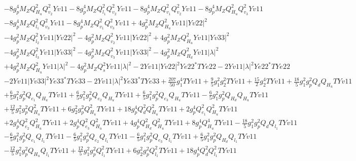 \begin{align}
 &-8 g_{p}^{4} M_Z Q_{H_u}^{2} Q_{v_2}^{2} Yv11 -8 g_{p}^{4} M_Z Q_{l_1}^{2} Q_{v_2}^{2} Yv11 -8 g_{p}^{4} M_Z Q_{v_1}^{2} Q_{v_2}^{2} Yv11 -8 g_{p}^{4} M_Z Q_{H_u}^{2} Q_{v_3}^{2} Yv11 \nonumber \\ 
 &-8 g_{p}^{4} M_Z Q_{l_1}^{2} Q_{v_3}^{2} Yv11 -8 g_{p}^{4} M_Z Q_{v_1}^{2} Q_{v_3}^{2} Yv11 +4 g_{p}^{2} M_Z Q_{H_u}^{2} Yv11 |Yv22|^2 \nonumber \\ 
 &-4 g_{p}^{2} M_Z Q_{l_2}^{2} Yv11 |Yv22|^2 -4 g_{p}^{2} M_Z Q_{v_2}^{2} Yv11 |Yv22|^2 +4 g_{p}^{2} M_Z Q_{H_u}^{2} Yv11 |Yv33|^2 \nonumber \\ 
 &-4 g_{p}^{2} M_Z Q_{l_3}^{2} Yv11 |Yv33|^2 -4 g_{p}^{2} M_Z Q_{v_3}^{2} Yv11 |Yv33|^2 -4 g_{p}^{2} M_Z Q_{H_d}^{2} Yv11 |\lambda|^2 \nonumber \\ 
 &+4 g_{p}^{2} M_Z Q_{H_u}^{2} Yv11 |\lambda|^2 -4 g_{p}^{2} M_Z Q_{s}^{2} Yv11 |\lambda|^2 -2 Yv11 |Yv22|^2 Ye22^* TYe22 -2 Yv11 |\lambda|^2 Ye22^* TYe22 \nonumber \\ 
 &-2 Yv11 |Yv33|^2 Ye33^* TYe33 -2 Yv11 |\lambda|^2 Ye33^* TYe33 +\frac{207}{50} g_{1}^{4} TYv11 +\frac{9}{5} g_{1}^{2} g_{2}^{2} TYv11 +\frac{15}{2} g_{2}^{4} TYv11 +\frac{18}{5} g_{1}^{2} g_{p}^{2} Q_{d} Q_{H_u} TYv11 \nonumber \\ 
 &+\frac{6}{5} g_{1}^{2} g_{p}^{2} Q_{e_{1}} Q_{H_u} TYv11 +\frac{6}{5} g_{1}^{2} g_{p}^{2} Q_{e_{2}} Q_{H_u} TYv11 +\frac{6}{5} g_{1}^{2} g_{p}^{2} Q_{e_3} Q_{H_u} TYv11 -\frac{6}{5} g_{1}^{2} g_{p}^{2} Q_{H_d} Q_{H_u} TYv11 \nonumber \\ 
 &+\frac{12}{5} g_{1}^{2} g_{p}^{2} Q_{H_u}^{2} TYv11 +6 g_{2}^{2} g_{p}^{2} Q_{H_u}^{2} TYv11 +18 g_{p}^{4} Q_{d}^{2} Q_{H_u}^{2} TYv11 +2 g_{p}^{4} Q_{e_{1}}^{2} Q_{H_u}^{2} TYv11 \nonumber \\ 
 &+2 g_{p}^{4} Q_{e_{2}}^{2} Q_{H_u}^{2} TYv11 +2 g_{p}^{4} Q_{e_3}^{2} Q_{H_u}^{2} TYv11 +4 g_{p}^{4} Q_{H_d}^{2} Q_{H_u}^{2} TYv11 +8 g_{p}^{4} Q_{H_u}^{4} TYv11 -\frac{18}{5} g_{1}^{2} g_{p}^{2} Q_{d} Q_{l_1} TYv11 \nonumber \\ 
 &-\frac{6}{5} g_{1}^{2} g_{p}^{2} Q_{e_{1}} Q_{l_1} TYv11 -\frac{6}{5} g_{1}^{2} g_{p}^{2} Q_{e_{2}} Q_{l_1} TYv11 -\frac{6}{5} g_{1}^{2} g_{p}^{2} Q_{e_3} Q_{l_1} TYv11 +\frac{6}{5} g_{1}^{2} g_{p}^{2} Q_{H_d} Q_{l_1} TYv11 \nonumber \\ 
 &-\frac{12}{5} g_{1}^{2} g_{p}^{2} Q_{H_u} Q_{l_1} TYv11 +\frac{12}{5} g_{1}^{2} g_{p}^{2} Q_{l_1}^{2} TYv11 +6 g_{2}^{2} g_{p}^{2} Q_{l_1}^{2} TYv11 +18 g_{p}^{4} Q_{d}^{2} Q_{l_1}^{2} TYv11 \nonumber \\ 

\end{align}
